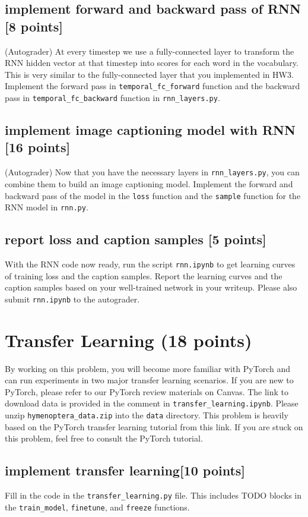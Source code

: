 \documentclass[lang=cn,11pt]{elegantbook}
\begin{document}
\subsection{implement forward and backward pass of RNN [8 points]}
(Autograder) At every timestep we use a fully-connected layer to transform the RNN hidden vector at that timestep into scores for each word in the vocabulary. This is very similar to the fully-connected layer that you implemented in HW3. Implement the forward pass in \texttt{temporal\_fc\_forward} function and the backward pass in \texttt{temporal\_fc\_backward} function in \texttt{rnn\_layers.py}.

\subsection{implement image captioning model with RNN [16 points]}
 (Autograder) Now that you have the necessary layers in \texttt{rnn\_layers.py}, you can combine them to build an image captioning model. Implement the forward and backward pass of the model in the \texttt{loss} function and the \texttt{sample} function for the RNN model in \texttt{rnn.py}.

\subsection*{report loss and caption samples [5 points]}
With the RNN code now ready, run the script \texttt{rnn.ipynb} to get learning curves of training loss and the caption samples. Report the learning curves and the caption samples based on your well-trained network in your writeup. Please also submit \texttt{rnn.ipynb} to the autograder.


\section{Transfer Learning (18 points)}
By working on this problem, you will become more familiar with PyTorch and can run experiments in two major transfer learning scenarios. If you are new to PyTorch, please refer to our PyTorch review materials on Canvas. The link to download data is provided in the comment in \texttt{transfer\_learning.ipynb}. Please unzip \texttt{hymenoptera\_data.zip} into the \texttt{data} directory.
This problem is heavily based on the PyTorch transfer learning tutorial from this link. If you are stuck on this problem, feel free to consult the PyTorch tutorial.

\subsection{implement transfer learning[10 points]}
Fill in the code in the \texttt{transfer\_learning.py} file. This includes TODO blocks in the \texttt{train\_model}, \texttt{finetune}, and \texttt{freeze} functions.
\end{document}
